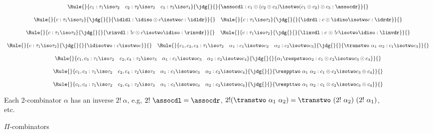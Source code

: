 \begin{figure*}[ht]
\[\begin{array}{c}
\Rule{}
{c_1 : \tau_1 \iso \tau_2 \quad c_2 : \tau_2 \iso \tau_3 \quad c_3 : \tau_3 \iso \tau_4}
{\jdg{}{}{\assocdl : c_1 \odot (c_2 \odot c_3) \isotwo (c_1 \odot c_2) \odot c_3 : \assocdr}}
{}
\\
\\
\Rule{}
{c : \tau_1 \iso \tau_2}
{\jdg{}{}{\idldl : \idiso \odot c \isotwo c : \idldr}}
{}
\quad
\Rule{}
{c : \tau_1 \iso \tau_2}
{\jdg{}{}{\idrdl : c \odot \idiso \isotwo c : \idrdr}}
{}
\\
\\
\Rule{}
{c : \tau_1 \iso \tau_2}
{\jdg{}{}{\rinvdl : ~! c \odot c \isotwo \idiso : \rinvdr}}
{}
\quad
\Rule{}
{c : \tau_1 \iso \tau_2}
{\jdg{}{}{\linvdl : c ~\odot ~! c \isotwo \idiso : \linvdr}}
{}
\\
\\
\Rule{}
{c : \tau_1 \iso \tau_2}
{\jdg{}{}{\idisotwo : c \isotwo c}}
{}
\quad
\Rule{}
{c_1,c_2,c_3 : \tau_1 \iso \tau_2 \quad \alpha_1 : c_1 \isotwo c_2 \quad \alpha_2 : c_2 \isotwo c_3}
{\jdg{}{}{\transtwo ~\alpha_1 ~\alpha_2 : c_1 \isotwo c_3}}
{}
\\
\\
\Rule{}
{c_1,c_3 : \tau_1 \iso \tau_2 \quad c_2,c_4 : \tau_2 \iso \tau_3 \quad
  \alpha_1 : c_1 \isotwo c_3 \quad \alpha_2 : c_2 \isotwo c_4}
{\jdg{}{}{\alpha_1 \respstwo \alpha_2 : c_1 \odot c_2 \isotwo c_3 \odot c_4}}
{}
\\
\\
\Rule{}
{c_1,c_3 : \tau_1 \iso \tau_2 \quad c_2,c_4 : \tau_2 \iso \tau_3 \quad
  \alpha_1 : c_1 \isotwo c_3 \quad \alpha_2 : c_2 \isotwo c_4}
{\jdg{}{}{\respptwo ~\alpha_1 ~\alpha_2 : c_1 \oplus c_2 \isotwo c_3 \oplus c_4}}
{}
\\
\\
\Rule{}
{c_1,c_3 : \tau_1 \iso \tau_2 \quad c_2,c_4 : \tau_2 \iso \tau_3 \quad
  \alpha_1 : c_1 \isotwo c_3 \quad \alpha_2 : c_2 \isotwo c_4}
{\jdg{}{}{\respttwo ~\alpha_1 ~\alpha_2 : c_1 \otimes c_2 \isotwo c_3 \otimes c_4}}
{}
\end{array}\]

Each 2-combinator $\alpha$ has an inverse $2!~\alpha$, e.g, $2!~\assocdl=\assocdr$,
$2!(\transtwo~\alpha_1~\alpha_2) = \transtwo~(2!~\alpha_2)~(2!~\alpha_1)$, etc. 

\caption{$\Pi$-combinators~\cite{James:2012:IE:2103656.2103667}
\label{pi-combinators2}}
\end{figure*}

